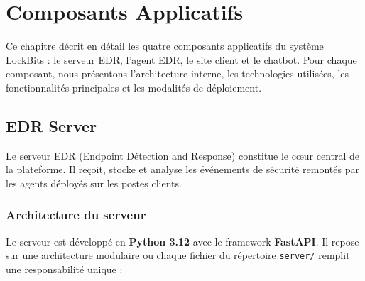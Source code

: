 
\chapter{Composants Applicatifs}

Ce chapitre décrit en détail les quatre composants applicatifs du système
LockBits : le serveur EDR, l'agent EDR, le site client et le chatbot.
Pour chaque composant, nous présentons l'architecture interne, les
technologies utilisées, les fonctionnalités principales et les modalités
de déploiement.


\section{EDR Server}

Le serveur EDR (Endpoint Détection and Response) constitue le c\oe{}ur
central de la plateforme. Il reçoit, stocke et analyse les événements de
sécurité remontés par les agents déployés sur les postes clients.

\subsection{Architecture du serveur}

Le serveur est développé en \textbf{Python 3.12} avec le framework
\textbf{FastAPI}. Il repose sur une architecture modulaire ou chaque
fichier du répertoire \texttt{server/} remplit une responsabilité unique :

